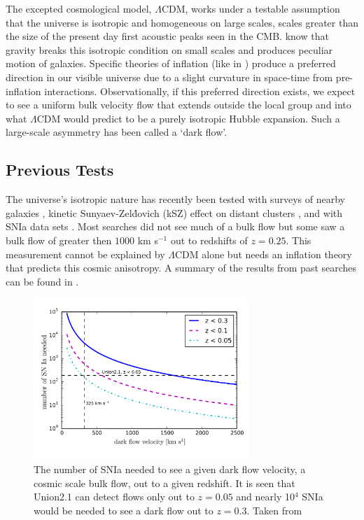 \documentclass[apj, iop]{emulateapj}
\newcommand{\sn}{SNIa}
\begin{document}
The excepted cosmological model, $\Lambda$CDM, works under a testable assumption
that the universe is isotropic and homogeneous on large scales, scales greater
than the size of the present day first acoustic peaks seen in the CMB.
know that gravity breaks this isotropic condition on small scales and produces
peculiar motion of galaxies. Specific theories of inflation (like in
\cite{MersiniHoughton:2008io}) produce a preferred direction in our visible
universe due to a slight curvature in space-time from pre-inflation
interactions. Observationally, if this preferred direction exists, we expect to
see a  uniform bulk velocity flow that extends outside the local group and into
what $\Lambda$CDM would predict to be a purely isotropic Hubble expansion. Such
a large-scale asymmetry has been called a `dark flow'.

\subsection{Previous Tests}\label{previous-tests}

The universe's isotropic nature has recently been tested with surveys of nearby
galaxies \citep{Ma13}, kinetic Sunyaev-Zel\'{d}ovich (kSZ) effect on distant
clusters \citep{Kashlinsky10,Planckdf}, and with \sn{} data sets \citep[and others as seen in ]{Dai11,Rathaus13}.
Most searches did not see much of a bulk flow but some saw a bulk flow of
greater then $1000$ km s$^{-1}$ out to redshifts of $z = 0.25$. This measurement
cannot be explained by $\Lambda$CDM alone but needs an inflation theory that
predicts this cosmic anisotropy.  A summary of the results from past searches can be found in
.


\begin{figure}
	\includegraphics[width=3.2in]{what_dataset_size_v_velocity.pdf} 
	\caption{The number of \sn{} needed to see a given dark flow
	velocity, a cosmic scale bulk flow, out to a given redshift. It is seen that
	Union2.1 can detect flows only out to $z=0.05$ and nearly 10$^4$ \sn{} would be needed to
	see a dark flow out to $z=0.3$. Taken from \cite{Mathews16}}
	\label{f:sn-needed} 
\end{figure}
\end{document}
